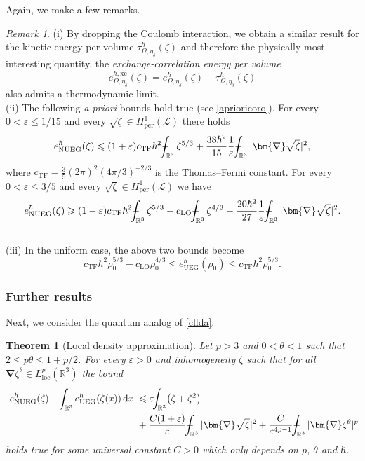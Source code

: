 \documentclass[final,onefignum,onetabnum,reqno]{amsart}
\newtheorem{theorem}{Theorem}[section]
\theoremstyle{remark}
\newtheorem{remark}{Remark}
\renewcommand{\le}{\leqslant}
\renewcommand{\ge}{\geqslant}
\renewcommand{\epsilon}{\varepsilon}
\newcommand{\RR}{\mathbb{R}}
\newcommand{\per}{\mathrm{per}} %
\newcommand{\xc}{\mathrm{xc}} %
\newcommand{\TF}{\mathrm{TF}} %
\newcommand{\LO}{\mathrm{LO}} %
\newcommand{\UEG}{\mathrm{UEG}} %
\newcommand{\NUEG}{\mathrm{NUEG}} %
\newcommand{\grad}{\bm{\nabla}} %
\newcommand{\dd}{\mathrm{d}} %
\newcommand{\Lloc}{L_{\mathrm{loc}}} %
\def\Xint#1{\mathchoice
{\XXint\displaystyle\textstyle{#1}}%
{\XXint\textstyle\scriptstyle{#1}}%
{\XXint\scriptstyle\scriptscriptstyle{#1}}%
{\XXint\scriptscriptstyle\scriptscriptstyle{#1}}%
\!\int}
\def\XXint#1#2#3{{\setbox0=\hbox{$#1{#2#3}{\int}$ }
\vcenter{\hbox{$#2#3$ }}\kern-.6\wd0}}
\def\dashint{\Xint-}
\newcommand{\LC}{\mathcal{L}}
\begin{document}
Again, we make a few remarks.

\begin{remark}\label{qnuegrmrk}
\noindent (i) By dropping the Coulomb interaction, we obtain a similar result for the kinetic energy per volume $\tau^\hbar_{\Omega,\eta_{\delta}}(\zeta)$ and therefore 
the physically most interesting quantity, the \emph{exchange-correlation energy per volume} 
$$
e^{\hbar,\xc}_{\Omega,\eta_{\delta}}(\zeta)=e^\hbar_{\Omega,\eta_{\delta}}(\zeta)- \tau^\hbar_{\Omega,\eta_{\delta}}(\zeta)
$$
also admits a thermodynamic limit. 
\vspace{.3em}\\
\noindent (ii) The following \emph{a priori} bounds hold true (see \cref{aprioricoro}). For every $0< \epsilon\le 1/15$ and every $\sqrt{\zeta}\in H^1_\per(\LC)$ there holds
$$
e_\NUEG^\hbar(\zeta)\le (1+\epsilon) c_{\TF}\hbar^2  \dashint_{\RR^3} \zeta^{5/3}+ \frac{38\hbar^2}{15}\frac{1}{\epsilon} \dashint_{\RR^3} |\grad \sqrt{\zeta}|^2,
$$
where $c_\TF=\frac{3}{5}(2\pi)^2 (4\pi/3)^{-2/3}$ is the Thomas--Fermi constant. 
For every $0<\epsilon\le 3/5$ and every $\sqrt{\zeta}\in H^1_\per(\LC)$ we have
$$
e_\NUEG^\hbar(\zeta)\ge (1-\epsilon) c_{\TF}\hbar^2  \dashint_{\RR^3} \zeta^{5/3}  - c_{\LO}  \dashint_{\RR^3} \zeta^{4/3}-\frac{20\hbar^2}{27}\frac{1}{\epsilon} \dashint_{\RR^3} |\grad \sqrt{\zeta}|^2.
$$
\vspace{.3em}\\
\noindent (iii) In the uniform case, the above two bounds become
$$
c_{\TF}\hbar^2\rho_0^{5/3}-c_\LO\rho_0^{4/3}\le e_\UEG^\hbar(\rho_0)\le c_{\TF}\hbar^2\rho_0^{5/3}.
$$
\end{remark}

\subsubsection{Further results}
Next, we consider the quantum analog of \cref{cllda}. 

\begin{theorem}[Local density approximation]\label{qlda}
Let $p>3$ and $0<\theta<1$ such that $2\le p\theta\le 1 + p/2$. For every $\epsilon>0$ and inhomogeneity $\zeta$ such that for all $\grad\zeta^\theta\in\Lloc^p(\RR^3)$ the
bound
\begin{align*}
\left| e_\NUEG^\hbar(\zeta) - \dashint_{\RR^3} e_\UEG^\hbar(\zeta(x))\,\dd x\right|&\le \epsilon \dashint_{\RR^3} \bigl( \zeta + \zeta^2 \bigr)\\
&+\frac{C(1+\epsilon)}{\epsilon} \dashint_{\RR^3} |\grad\sqrt{\zeta}|^2 + \frac{C}{\epsilon^{4p-1}} \dashint_{\RR^3} |\grad\zeta^\theta|^p
\end{align*}
holds true for some universal constant $C>0$ which only depends on  $p$, $\theta$ and $\hbar$.
\end{theorem}
\end{document}
